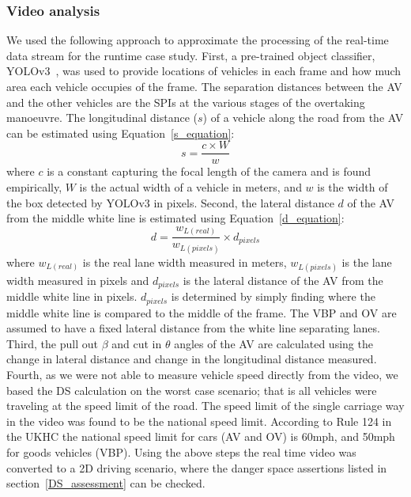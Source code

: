 \subsubsection{Video analysis}
%
We used the following approach to approximate the processing of the real-time data stream for the runtime case study. 
%
First, a pre-trained object classifier, YOLOv3~\cite{Yolo}, was used to provide locations of vehicles in each frame and how much area each vehicle occupies of the frame. 
%
The separation distances between the AV and the other vehicles are the SPIs at the various stages of the overtaking manoeuvre. 
%
The longitudinal distance ($s$) of a vehicle along the road from the AV can be estimated 
using Equation~\ref{s_equation}:
\begin{equation}\label{s_equation}
    s = \frac{c\times W}{w}
\end{equation}
where $c$ is a constant capturing the focal length of the camera and is found empirically, $W$ is the actual width of a vehicle in meters, and $w$ is the width of the box detected by YOLOv3 in pixels. 
%
Second, the lateral distance $d$ of the AV from the middle white line is estimated using Equation~\ref{d_equation}: 
%
\begin{equation}\label{d_equation}
    d = \frac{w_{L (real)}}{w_{L (pixels)}} \times d_{pixels}
\end{equation}
%
where $w_{L (real)}$ is the real lane width measured in meters, $w_{L (pixels)}$ is the lane width measured in pixels and $d_{pixels}$ is the lateral distance of the AV from the middle white line in pixels. $d_{pixels}$ is determined by simply finding where the middle white line is compared to the middle of the frame. The VBP and OV are assumed to have a fixed lateral distance from the white line separating lanes. Third, the pull out $\beta$ and cut in $\theta$ angles of the AV are calculated using the change in lateral distance and change in the longitudinal distance measured. Fourth, as we were not able to measure vehicle speed directly from the video, we based the DS calculation on the worst case scenario; that is all vehicles were traveling at the speed limit of the road. The speed limit of the single carriage way in the video was found to be the national speed limit. According to Rule 124 in the UKHC the national speed limit for cars (AV and OV) is 60mph, and 50mph for goods vehicles (VBP). Using the above steps the real time video was converted to a 2D driving scenario, where the danger space assertions listed in section~\ref{DS_assessment} can be checked.

